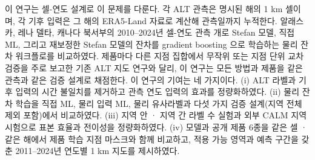 이 연구는 셀-연도 설계로 이 문제를 다룬다. 각 ALT 관측은 명시된 해의 1 km 셀이며, 각 기후 입력은 그 해의 ERA5-Land 자료로 계산해 관측일까지 누적한다\cite{munozsabater2021_era5_land}. 알래스카, 레나 델타, 캐나다 북서부의 2010--2024년 셀-연도 관측 \nncyAll{}개로 Stefan 모델, 직접 ML, 그리고 재보정한 Stefan 모델의 잔차를 gradient boosting 으로 학습하는 물리 잔차 워크플로를 비교하였다. 제품마다 다른 지점 집합에서 무작위 또는 지점 단위 교차검증을 주로 보고한 기존 ALT 지도 연구\cite{Liu2024,Wei2026,Ran2022a}와 달리, 이 연구는 모든 방법과 제품을 같은 관측과 같은 검증 설계로 채점한다. 이 연구의 기여는 네 가지이다. (i) ALT 라벨과 기후 입력의 시간 불일치를 제거하고 관측 연도 입력의 효과를 정량화하였다. (ii) 물리 잔차 학습을 직접 ML, 물리 입력 ML, 물리 유사라벨과 다섯 가지 검증 설계(지역 전체 제외 포함)에서 비교하였다. (iii) 지역 안 · 지역 간 라벨 수 실험과 외부 CALM 지역 시험으로 표본 효율과 전이성을 정량화하였다. (iv) 모델과 공개 제품 6종을 같은 셀 · 같은 해에서 제품 학습 지점 마스크와 함께 비교하고, 적용 가능 영역과 예측 구간을 갖춘 2011--2024년 연도별 1 km 지도를 제시하였다.
